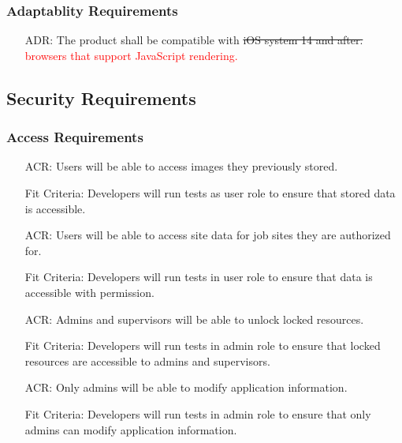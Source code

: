\documentclass[12pt]{article}
\newcounter{reqnum} %
\newcounter{acrreqnum} %
\newcounter{adrreqnum} %
\newcounter{crreqnum} %
\begin{document}
\subsubsection{Adaptablity Requirements}
\begin{itemize}
    \item[ADR\refstepcounter{adrreqnum}\theadrreqnum \label{R_Inputs}:] 
    The product shall be compatible with \sout{iOS system 14 and after.} \textcolor{red}{browsers that support JavaScript rendering.}
    
\end{itemize}

\subsection{Security Requirements}

\subsubsection{Access Requirements}
\begin{itemize}
    \item[ACR\refstepcounter{acrreqnum}\theacrreqnum \label{R_Inputs}:] Users will be able to access images they previously stored.
    \item[] Fit Criteria: Developers will run tests as user role to ensure that stored data is accessible.
    \item[ACR\refstepcounter{acrreqnum}\theacrreqnum\label{R_Inputs}:] 
    Users will be able to access site data for job sites they are authorized for.
    \item[] Fit Criteria: Developers will run tests in user role to ensure that data is accessible with permission.
    \item[ACR\refstepcounter{acrreqnum}\theacrreqnum \label{R_Inputs}:]
    Admins and supervisors will be able to unlock locked resources.
    \item[] Fit Criteria: Developers will run tests in admin role to ensure that locked resources are accessible to admins and supervisors.
    \item[ACR\refstepcounter{acrreqnum}\theacrreqnum \label{R_Inputs}:]
    Only admins will be able to modify application information.
    \item[] Fit Criteria: Developers will run tests in admin role to ensure that only admins can modify application information.
\end{itemize}
\end{document}
